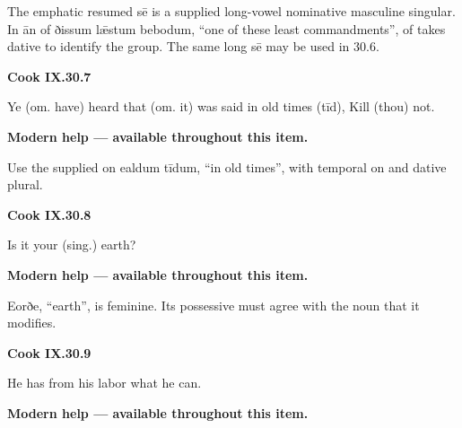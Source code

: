 The emphatic resumed sē is a supplied long-vowel nominative masculine singular. In ān of ðissum lǣstum bebodum, “one of these least commandments”, of takes dative to identify the group. The same long sē may be used in 30.6.

\par\begin{minipage}{\linewidth}\raggedright
\textbf{Cook IX.30.7}

Ye (om. have) heard that (om. it) was said in old times (tīd), Kill (thou) not.

\textbf{Modern help — available throughout this item.}

\end{minipage}\par\addvspace{4pt}

Use the supplied on ealdum tīdum, “in old times”, with temporal on and dative plural.

\par\begin{minipage}{\linewidth}\raggedright
\textbf{Cook IX.30.8}

Is it your (sing.) earth?

\textbf{Modern help — available throughout this item.}

\end{minipage}\par\addvspace{4pt}

Eorðe, “earth”, is feminine. Its possessive must agree with the noun that it modifies.

\par\begin{minipage}{\linewidth}\raggedright
\textbf{Cook IX.30.9}

He has from his labor what he can.

\textbf{Modern help — available throughout this item.}

\end{minipage}\par\addvspace{4pt}

